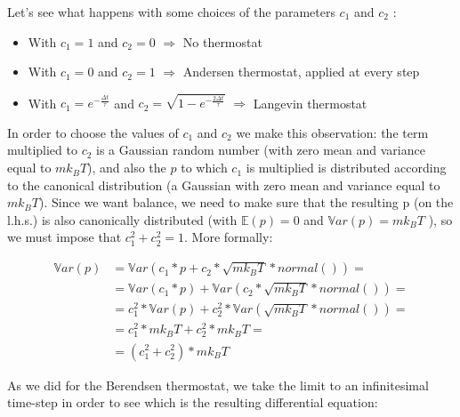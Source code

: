 Let's see what happens with some choices of the parameters $c_1$ and $c_2$ :
\begin{itemize}
\item With $c_1=1$ and $c_2=0$ \hspace{0.5cm} $\Longrightarrow$ \hspace{0.5cm} No thermostat
\item With $c_1=0$ and $c_2=1$ \hspace{0.5cm} $\Longrightarrow$ \hspace{0.5cm} Andersen thermostat, applied at every step
\item With $c_1=e^{-\frac{\Delta t}{\tau}}$ and $c_2= \sqrt{1- e^{-\frac{2\Delta t}{\tau}}}$ \hspace{0.5cm} $\Longrightarrow$ \hspace{0.5cm} Langevin thermostat
\end{itemize}
In order to choose the values of $c_1$ and $c_2$ we make this observation: the term multiplied to $c_2$ is a Gaussian random number (with zero mean and variance equal to $mk_B T$), and also the $p$ to which $c_1$ is multiplied is distributed according to the canonical distribution (a Gaussian with zero mean and variance equal to $mk_B T$). Since we want balance, we need to make sure that the resulting p (on the l.h.s.) is also canonically distributed (with $\mathbb{E}(p)=0$ and $\mathbb{V}ar(p)=mk_BT$ ), so we must impose that  
$c_1^2+c_2^2 = 1$. More formally:

    \begin{align*}
    \mathbb{V}ar(p) &= \mathbb{V}ar(c_1*p+c_2*\sqrt{mk_BT}*normal()) =\\
                    &= \mathbb{V}ar (c_1*p) + \mathbb{V}ar(c_2*\sqrt{mk_BT}*normal())=\\
                    &= c_1^2*\mathbb{V}ar (p) + c_2^2*\mathbb{V}ar(\sqrt{mk_BT}*normal())=\\
                    &= c_1^2*mk_BT + c_2^2*mk_BT=\\
                    &= (c_1^2+ c_2^2)*mk_BT
    \end{align*}

As we did for the Berendsen thermostat, we take the limit to an infinitesimal time-step in order to see which is the resulting differential equation:

